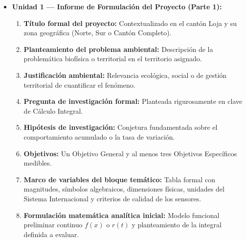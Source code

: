 \documentclass[11pt,a4paper]{article}
\begin{document}
\begin{guidelinebox}[title=Estructura Acumulativa del Informe por Unidad]
\begin{itemize}[leftmargin=*,itemsep=3pt]
  \item \textbf{Unidad 1 — Informe de Formulación del Proyecto (Parte 1):}
  \begin{enumerate}[label=\alph*),itemsep=1.5pt]
    \item \textbf{Título formal del proyecto:} Contextualizado en el cantón Loja y su zona geográfica (Norte, Sur o Cantón Completo).
    \item \textbf{Planteamiento del problema ambiental:} Descripción de la problemática biofísica o territorial en el territorio asignado.
    \item \textbf{Justificación ambiental:} Relevancia ecológica, social o de gestión territorial de cuantificar el fenómeno.
    \item \textbf{Pregunta de investigación formal:} Planteada rigurosamente en clave de Cálculo Integral.
    \item \textbf{Hipótesis de investigación:} Conjetura fundamentada sobre el comportamiento acumulado o la tasa de variación.
    \item \textbf{Objetivos:} Un Objetivo General y al menos tres Objetivos Específicos medibles.
    \item \textbf{Marco de variables del bloque temático:} Tabla formal con magnitudes, símbolos algebraicos, dimensiones físicas, unidades del Sistema Internacional y criterios de calidad de los sensores.
    \item \textbf{Formulación matemática analítica inicial:} Modelo funcional preliminar continuo $f(x)$ o $r(t)$ y planteamiento de la integral definida a evaluar.
  \end{enumerate}
  

\end{itemize}
\end{guidelinebox}
\end{document}
